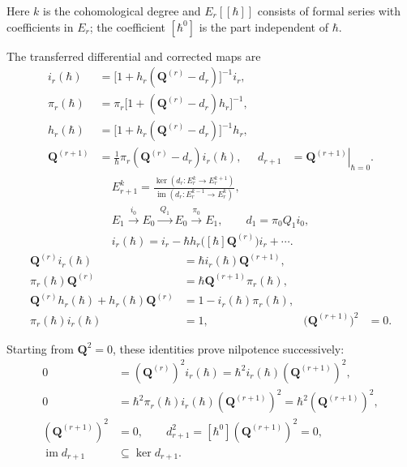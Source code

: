 \documentclass[11pt]{article}
\numberwithin{equation}{section}
\numberwithin{figure}{section}
\numberwithin{table}{section}
\begin{document}
Here $k$ is the cohomological degree and $E_r[[\hbar]]$ consists of formal series with coefficients in $E_r$; the coefficient $[\hbar^0]$ is the part independent of $\hbar$.

The transferred differential and corrected maps are
\begin{equation}\label{eq-page-transfer}
\begin{aligned}
i_r(\hbar)
&=\bigl[1+h_r(\mathbf Q^{(r)}-d_r)\bigr]^{-1}i_r,\\
\pi_r(\hbar)
&=\pi_r\bigl[1+(\mathbf Q^{(r)}-d_r)h_r\bigr]^{-1},\\
h_r(\hbar)
&=\bigl[1+h_r(\mathbf Q^{(r)}-d_r)\bigr]^{-1}h_r,\\
\mathbf Q^{(r+1)}
&=\frac1\hbar\pi_r(\mathbf Q^{(r)}-d_r)i_r(\hbar),
&d_{r+1}&=\left.\mathbf Q^{(r+1)}\right|_{\hbar=0}.
\end{aligned}
\end{equation}
\begin{equation}\label{local-e52b9a7e-2ebd-454e-bac8-73e190f43160}
\begin{gathered}
E_{r+1}^k=\frac{\ker(d_r:E_r^k\to E_r^{k+1})}
{\operatorname{im}(d_r:E_r^{k-1}\to E_r^k)},\\
E_1\xrightarrow{\ i_0\ }E_0\xrightarrow{\ Q_1\ }E_0\xrightarrow{\ \pi_0\ }E_1,
\qquad d_1=\pi_0Q_1i_0,\\
i_r(\hbar)=i_r-\hbar h_r\bigl([\hbar]\mathbf Q^{(r)}\bigr)i_r+\cdots.
\end{gathered}
\end{equation}
\begin{equation}\label{eq-page-transfer-identities}
\begin{aligned}
\mathbf Q^{(r)}i_r(\hbar)
&=\hbar i_r(\hbar)\mathbf Q^{(r+1)},\\
\pi_r(\hbar)\mathbf Q^{(r)}
&=\hbar\mathbf Q^{(r+1)}\pi_r(\hbar),\\
\mathbf Q^{(r)}h_r(\hbar)+h_r(\hbar)\mathbf Q^{(r)}
&=1-i_r(\hbar)\pi_r(\hbar),\\
\pi_r(\hbar)i_r(\hbar)&=1,
&\bigl(\mathbf Q^{(r+1)}\bigr)^2&=0.
\end{aligned}
\end{equation}

Starting from $\mathbf Q^2=0$, these identities prove nilpotence successively:
\begin{equation}\label{local-e7bff0bc-9d66-44d3-8aee-afde4475cf2f}
\begin{aligned}
0&=(\mathbf Q^{(r)})^2i_r(\hbar)
=\hbar^2i_r(\hbar)(\mathbf Q^{(r+1)})^2,\\
0&=\hbar^2\pi_r(\hbar)i_r(\hbar)(\mathbf Q^{(r+1)})^2
=\hbar^2(\mathbf Q^{(r+1)})^2,\\
(\mathbf Q^{(r+1)})^2&=0,
\qquad d_{r+1}^2=[\hbar^0](\mathbf Q^{(r+1)})^2=0,\\
\operatorname{im}d_{r+1}&\subseteq\ker d_{r+1}.
\end{aligned}
\end{equation}
\end{document}
